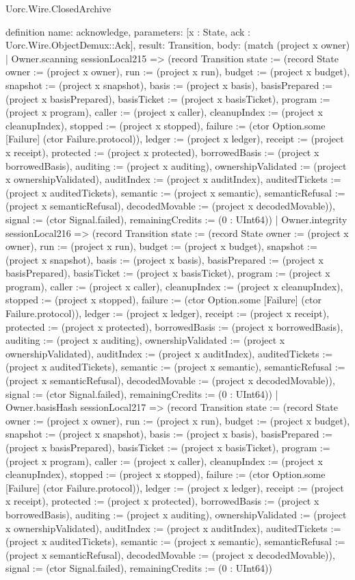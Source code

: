 \begin{lexlean}{Uorc.Wire.ClosedArchive}
\begin{semanticmodule}
definition{
  name: acknowledge,
  parameters: [x : State, ack : Uorc.Wire.ObjectDemux::Ack],
  result: Transition,
  body: (match (project x owner)
    | Owner.scanning sessionLocal215 => (record Transition {state := (record State {owner := (project x owner), run := (project x run), budget := (project x budget), snapshot := (project x snapshot), basis := (project x basis), basisPrepared := (project x basisPrepared), basisTicket := (project x basisTicket), program := (project x program), caller := (project x caller), cleanupIndex := (project x cleanupIndex), stopped := (project x stopped), failure := (ctor Option.some [Failure] (ctor Failure.protocol)), ledger := (project x ledger), receipt := (project x receipt), protected := (project x protected), borrowedBasis := (project x borrowedBasis), auditing := (project x auditing), ownershipValidated := (project x ownershipValidated), auditIndex := (project x auditIndex), auditedTickets := (project x auditedTickets), semantic := (project x semantic), semanticRefusal := (project x semanticRefusal), decodedMovable := (project x decodedMovable)}), signal := (ctor Signal.failed), remainingCredits := (0 : UInt64)})
    | Owner.integrity sessionLocal216 => (record Transition {state := (record State {owner := (project x owner), run := (project x run), budget := (project x budget), snapshot := (project x snapshot), basis := (project x basis), basisPrepared := (project x basisPrepared), basisTicket := (project x basisTicket), program := (project x program), caller := (project x caller), cleanupIndex := (project x cleanupIndex), stopped := (project x stopped), failure := (ctor Option.some [Failure] (ctor Failure.protocol)), ledger := (project x ledger), receipt := (project x receipt), protected := (project x protected), borrowedBasis := (project x borrowedBasis), auditing := (project x auditing), ownershipValidated := (project x ownershipValidated), auditIndex := (project x auditIndex), auditedTickets := (project x auditedTickets), semantic := (project x semantic), semanticRefusal := (project x semanticRefusal), decodedMovable := (project x decodedMovable)}), signal := (ctor Signal.failed), remainingCredits := (0 : UInt64)})
    | Owner.basisHash sessionLocal217 => (record Transition {state := (record State {owner := (project x owner), run := (project x run), budget := (project x budget), snapshot := (project x snapshot), basis := (project x basis), basisPrepared := (project x basisPrepared), basisTicket := (project x basisTicket), program := (project x program), caller := (project x caller), cleanupIndex := (project x cleanupIndex), stopped := (project x stopped), failure := (ctor Option.some [Failure] (ctor Failure.protocol)), ledger := (project x ledger), receipt := (project x receipt), protected := (project x protected), borrowedBasis := (project x borrowedBasis), auditing := (project x auditing), ownershipValidated := (project x ownershipValidated), auditIndex := (project x auditIndex), auditedTickets := (project x auditedTickets), semantic := (project x semantic), semanticRefusal := (project x semanticRefusal), decodedMovable := (project x decodedMovable)}), signal := (ctor Signal.failed), remainingCredits := (0 : UInt64)})
}
\end{semanticmodule}
\end{lexlean}
